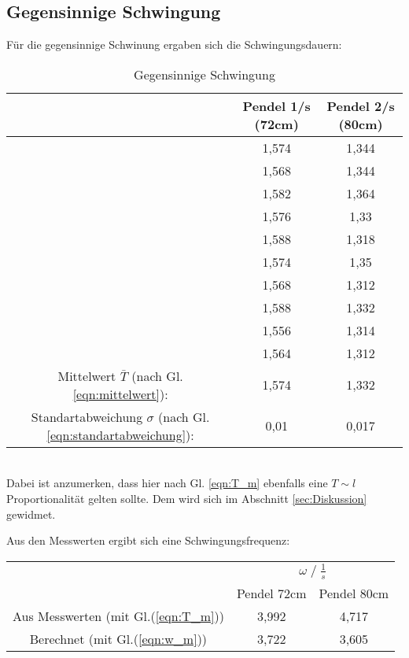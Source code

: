 \subsection{Gegensinnige Schwingung}
Für die gegensinnige Schwinung ergaben sich die Schwingungsdauern:
\begin{table}
    \centering
    \label{tab:Data_gegenphasig}
    \begin{tabular}{c c | c}
        \toprule
        & Pendel 1\;/\;s (72cm) & Pendel 2\;/\;s (80cm)\\
        \midrule
        & 1,574 & 1,344 \\
        & 1,568 & 1,344 \\
        & 1,582 & 1,364 \\
        & 1,576 & 1,33  \\
        & 1,588 & 1,318 \\
        & 1,574 & 1,35  \\
        & 1,568 & 1,312 \\
        & 1,588 & 1,332 \\
        & 1,556 & 1,314 \\
        & 1,564 & 1,312 \\
        \midrule
        Mittelwert $\bar{T}$ (nach Gl. \ref{eqn:mittelwert}): & 1,574 & 1,332 \\
        Standartabweichung $\sigma$ (nach Gl. \ref{eqn:standartabweichung}): & 0,01 & 0,017 \\
        \bottomrule
    \end{tabular}
    \caption{Gegensinnige Schwingung}
\end{table}
\\Dabei ist anzumerken, dass hier nach Gl. \ref{eqn:T_m} ebenfalls eine $T \sim l$ Proportionalität
gelten sollte. Dem wird sich im Abschnitt \ref{sec:Diskussion} gewidmet.\newline

Aus den Messwerten ergibt sich eine Schwingungsfrequenz:
\begin{table}
    \centering
    \label{tab:frq_gegens}
    \begin{tabular}{c c c}
        \toprule
        & \multicolumn{2}{c}{$\omega\;/\;\frac{1}{s}$}\\
        \cmidrule(lr){2-3} 
        & Pendel 72cm & Pendel 80cm\\
        \midrule
        Aus Messwerten (mit Gl.(\ref{eqn:T_m})) & 3,992 & 4,717 \\
        Berechnet (mit Gl.(\ref{eqn:w_m}))      & 3,722 & 3,605 \\
        \bottomrule
    \end{tabular}
\end{table}
\newpage
